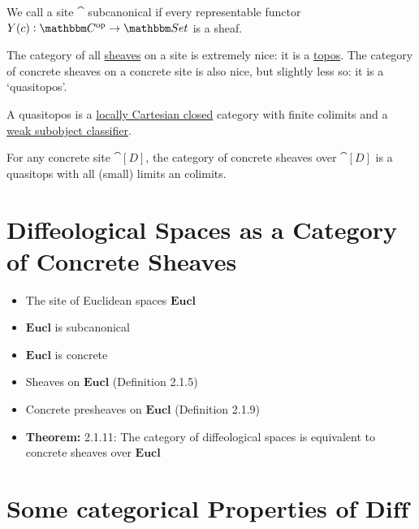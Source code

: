 \documentclass[a4paper,11pt,fleqn]{article}  %
\begin{document}
\begin{definition}
 We call a site $\cat$ subcanonical if every representable functor $Y(c): \cat^\op \to \Set$ is a sheaf.
\end{definition}

The category of all \href{https://ncatlab.org/nlab/show/sheaf#GeneralDefinitionAbstractly}{sheaves} on a site is extremely nice: it is a \href{https://ncatlab.org/nlab/show/topos#definitions}{topos}. 
The category of concrete sheaves on a concrete site is also nice, but slightly less so: it is a ‘quasitopos’. 

\begin{definition}
A quasitopos is a \href{https://ncatlab.org/nlab/show/locally+cartesian+closed+category#definition}{locally Cartesian closed} category with finite colimits and a \href{https://ncatlab.org/nlab/show/subobject+classifier#weak_subobject_classifier}{weak subobject classifier}.
\end{definition}

\begin{theorem}
For any concrete site $\cat[D]$, the category of concrete sheaves over $\cat[D]$ is a quasitops with all (small) limits an colimits.
\end{theorem}




\section{ Diffeological Spaces as a Category of Concrete Sheaves}
\begin{itemize}
    \item The site of Euclidean spaces $\textbf{Eucl}$
    \item $\textbf{Eucl}$ is subcanonical
    \item $\textbf{Eucl}$ is concrete
    \item Sheaves on $\textbf{Eucl}$ (Definition 2.1.5)
    \item Concrete presheaves on $\textbf{Eucl}$ (Definition 2.1.9)
    \item \textbf{Theorem:} 2.1.11: The category of diffeological spaces is equivalent to concrete sheaves over $\textbf{Eucl}$
\end{itemize}

\section{Some categorical Properties of $\textbf{Diff}$}
\end{document}
